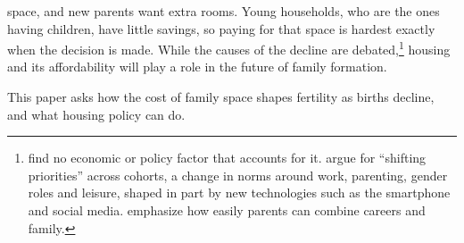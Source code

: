 space, and new parents want extra rooms. Young households, who are the ones
having children, have little savings, so paying for that space is hardest
exactly when the decision is made. While the causes of the decline are
debated,\footnote{\citet{kearneyPuzzleFallingUS2022} find no economic or
policy factor that accounts for it. \citet{kearneyLevineWhyFertilityLow2025}
argue for ``shifting priorities'' across cohorts, a change in norms around
work, parenting, gender roles and leisure, shaped in part by new
technologies such as the smartphone and social media.
\citet{doepkeEconomicsFertilityNew2023} emphasize how easily parents can
combine careers and family.} housing and its affordability will play a role
in the future of family formation.

This paper asks how the cost of family space shapes fertility as births
decline, and what housing policy can do.

